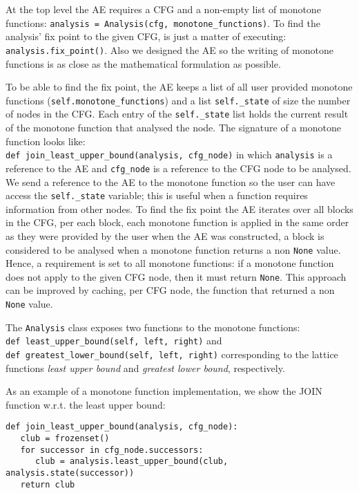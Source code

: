 \newpar At the top level the AE requires a CFG and a non-empty list of monotone functions: \lstinline{analysis = Analysis(cfg, monotone_functions)}. To find the analysis' fix point to the given CFG, is just a matter of executing: \lstinline{analysis.fix_point()}. Also we designed the AE so the writing of monotone functions is as close as the mathematical formulation as possible.

\newpar To be able to find the fix point, the AE keeps a list of all user provided monotone functions (\lstinline{self.monotone_functions}) and a list \lstinline{self._state} of size the number of nodes in the CFG. Each entry of the \lstinline{self._state} list holds the current result of the monotone function that analysed the node. The signature of a monotone function looks like: \\\lstinline{def join_least_upper_bound(analysis, cfg_node)} in which \lstinline{analysis} is a reference to the AE and \lstinline{cfg_node} is a reference to the CFG node to be analysed. We send a reference to the AE to the monotone function so the user can have access the
\lstinline{self._state} variable; this is useful when a function requires information from other nodes.
To find the fix point the AE iterates over all blocks in the CFG, per each block, each monotone function is applied in the same order as they were provided by the user when the AE was constructed, a block is considered to be analysed when a monotone function returns a non \lstinline{None} value. Hence, a requirement is set to all monotone functions: if a monotone function does not apply to the given CFG node, then it must return \lstinline{None}. This approach can be improved by caching, per CFG node, the function that returned a non \lstinline{None} value.

\newpar The \lstinline{Analysis} class exposes two functions to the monotone functions: \\\lstinline{def least_upper_bound(self, left, right)} and \\\lstinline{def greatest_lower_bound(self, left, right)} corresponding to the lattice functions \emph{least upper bound} and \emph{greatest lower bound}, respectively.

As an example of a monotone function implementation, we show the JOIN function w.r.t. the least upper bound: 
\begin{verbatim}
def join_least_upper_bound(analysis, cfg_node):
   club = frozenset()
   for successor in cfg_node.successors:
      club = analysis.least_upper_bound(club, analysis.state(successor))
   return club
\end{verbatim}

